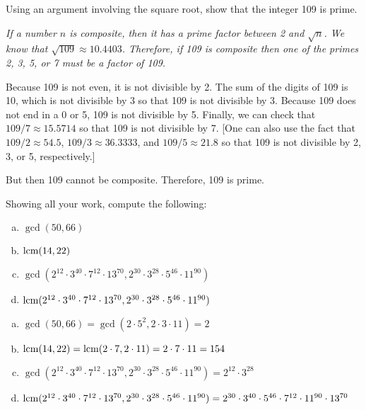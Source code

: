 \documentclass[12pt,letterpaper]{exam}
\begin{document}
\begin{questions}
\newpage
\question[10] Using an argument involving the square root, show that the integer 109 is prime. \pspace

{\itshape If a number $n$ is composite, then it has a prime factor between 2 and $\sqrt{n}$. We know that $\sqrt{109} \approx 10.4403$. Therefore, if 109 is composite then one of the primes 2, 3, 5, or 7 must be a factor of 109. \pspace

Because 109 is not even, it is not divisible by 2. The sum of the digits of 109 is 10, which is not divisible by 3 so that 109 is not divisible by 3. Because 109 does not end in a 0 or 5, 109 is not divisible by 5. Finally, we can check that $109/7 \approx 15.5714$ so that 109 is not divisible by 7. [One can also use the fact that $109/2 \approx 54.5$, $109/3 \approx 36.3333$, and $109/5 \approx 21.8$ so that 109 is not divisible by 2, 3, or 5, respectively.] \pspace

But then 109 cannot be composite. Therefore, 109 is prime. 
}



\newpage
\question[10] Showing all your work, compute the following:
	\begin{enumerate}[(a)]
	\item $\gcd(50, 66)$
	\item $\operatorname{lcm}(14, 22)$
	\item $\gcd(2^{12} \cdot 3^{40} \cdot 7^{12} \cdot 13^{70}, 2^{30} \cdot 3^{28} \cdot 5^{46} \cdot 11^{90})$
	\item $\operatorname{lcm}(2^{12} \cdot 3^{40} \cdot 7^{12} \cdot 13^{70}, 2^{30} \cdot 3^{28} \cdot 5^{46} \cdot 11^{90})$
	\end{enumerate} \pspace

\sol
\begin{enumerate}[(a)]
\item $\gcd(50, 66)= \gcd(2 \cdot 5^2, 2 \cdot 3 \cdot 11)= 2$ \pspace

\item $\operatorname{lcm}(14, 22)= \operatorname{lcm}(2 \cdot 7, 2 \cdot 11)= 2 \cdot 7 \cdot 11= 154$ \pspace

\item $\gcd(2^{12} \cdot 3^{40} \cdot 7^{12} \cdot 13^{70}, 2^{30} \cdot 3^{28} \cdot 5^{46} \cdot 11^{90})= 2^{12} \cdot 3^{28}$ \pspace

\item $\operatorname{lcm}(2^{12} \cdot 3^{40} \cdot 7^{12} \cdot 13^{70}, 2^{30} \cdot 3^{28} \cdot 5^{46} \cdot 11^{90})= 2^{30} \cdot 3^{40} \cdot 5^{46} \cdot 7^{12} \cdot 11^{90} \cdot 13^{70}$
\end{enumerate}




\end{questions}
\end{document}
